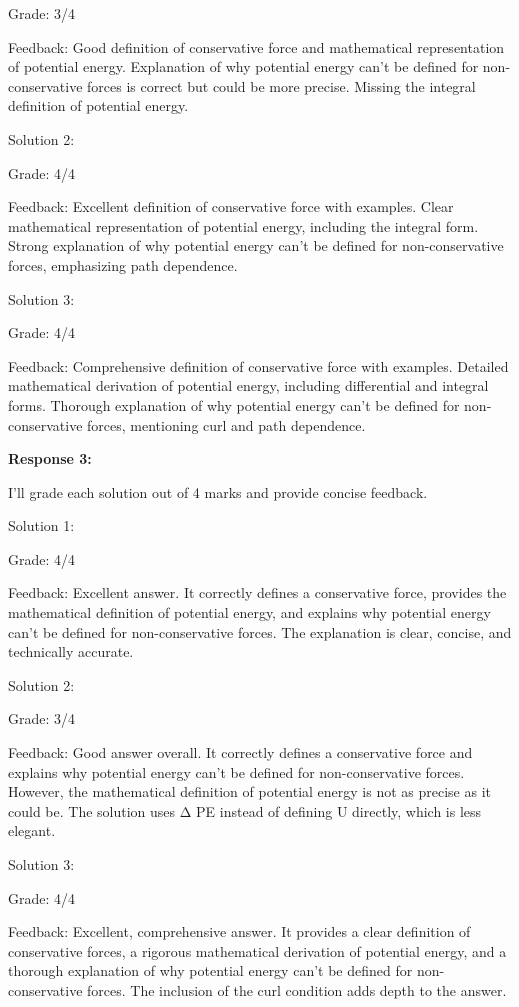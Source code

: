 \documentclass[a4paper,11pt]{article}
\begin{document}
Grade: 3/4

Feedback: Good definition of conservative force and mathematical representation of potential energy. Explanation of why potential energy can't be defined for non-conservative forces is correct but could be more precise. Missing the integral definition of potential energy.

Solution 2:

Grade: 4/4

Feedback: Excellent definition of conservative force with examples. Clear mathematical representation of potential energy, including the integral form. Strong explanation of why potential energy can't be defined for non-conservative forces, emphasizing path dependence.

Solution 3:

Grade: 4/4

Feedback: Comprehensive definition of conservative force with examples. Detailed mathematical derivation of potential energy, including differential and integral forms. Thorough explanation of why potential energy can't be defined for non-conservative forces, mentioning curl and path dependence.

\bigskip    
\textbf{Response 3:}

I'll grade each solution out of 4 marks and provide concise feedback.

Solution 1:

Grade: 4/4

Feedback: Excellent answer. It correctly defines a conservative force, provides the mathematical definition of potential energy, and explains why potential energy can't be defined for non-conservative forces. The explanation is clear, concise, and technically accurate.

Solution 2:

Grade: 3/4

Feedback: Good answer overall. It correctly defines a conservative force and explains why potential energy can't be defined for non-conservative forces. However, the mathematical definition of potential energy is not as precise as it could be. The solution uses Δ PE instead of defining U directly, which is less elegant.

Solution 3:

Grade: 4/4

Feedback: Excellent, comprehensive answer. It provides a clear definition of conservative forces, a rigorous mathematical derivation of potential energy, and a thorough explanation of why potential energy can't be defined for non-conservative forces. The inclusion of the curl condition adds depth to the answer.
\end{document}
